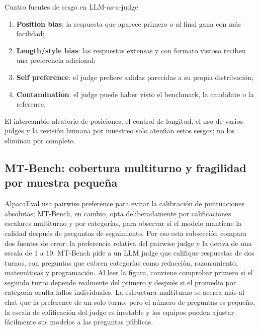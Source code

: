 \documentclass[a4paper]{article}
\begin{document}
\begin{warningbox}{Cuatro fuentes de sesgo en LLM-as-a-judge}
\begin{enumerate}
  \item \textbf{Position bias}: la respuesta que aparece primero o al final gana con más facilidad;
  \item \textbf{Length/style bias}: las respuestas extensas y con formato vistoso reciben una preferencia adicional;
  \item \textbf{Self preference}: el judge prefiere salidas parecidas a su propia distribución;
  \item \textbf{Contamination}: el judge puede haber visto el benchmark, la candidate o la reference.
\end{enumerate}
El intercambio aleatorio de posiciones, el control de longitud, el uso de varios judges y la revisión humana por muestreo solo atenúan estos sesgos; no los eliminan por completo.
\end{warningbox}


\subsection{MT-Bench: cobertura multiturno y fragilidad por muestra pequeña}

AlpacaEval usa pairwise preference para evitar la calibración de puntuaciones absolutas; MT-Bench, en cambio, opta deliberadamente por calificaciones escalares multiturno y por categorías, para observar si el modelo mantiene la calidad después de preguntas de seguimiento. Por eso esta subsección compara dos fuentes de error: la preferencia relativa del pairwise judge y la deriva de una escala de 1 a 10. MT-Bench pide a un LLM judge que califique respuestas de dos turnos, con preguntas que cubren categorías como redacción, razonamiento, matemáticas y programación. Al leer la figura, conviene comprobar primero si el segundo turno depende realmente del primero y después si el promedio por categoría oculta fallos individuales. La estructura multiturno se acerca más al chat que la preference de un solo turno, pero el número de preguntas es pequeño, la escala de calificación del judge es inestable y los equipos pueden ajustar fácilmente sus modelos a las preguntas públicas.
\end{document}

